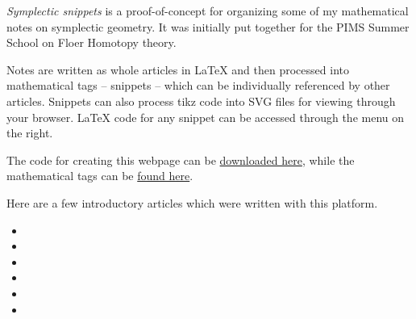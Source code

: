 
\emph{Symplectic snippets} is a proof-of-concept for organizing some of my mathematical notes on symplectic geometry. It was initially put together for the PIMS Summer School on Floer Homotopy theory. 

Notes are written as whole articles in LaTeX and then processed into mathematical tags -- snippets -- which can be individually referenced by other articles. Snippets can also process tikz code into SVG files for viewing through your browser. LaTeX code for any snippet can be accessed through the menu on the right. 

The code for creating this webpage can be 
\href{https://github.com/jeffsthicks/Snippets}{downloaded here}, while the mathematical tags can be \href{https://github.com/jeffsthicks/tags}{found here}.

Here are a few introductory articles which were written with this platform.

\begin{itemize}
    \item {}
    \item {}
    \item {}
    \item {}
    \item {}
    \item {}
\end{itemize}
